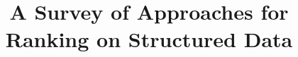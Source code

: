 %
%
%
%
%
%
\documentclass[twocolumn]{svjour3}          %
%
\smartqed  %
%
%
%
%
%

\usepackage{graphicx,amssymb,subfig}
\usepackage{times}
\usepackage{helvet}
\usepackage{courier}
\usepackage{url}
\usepackage{latexsym}
\usepackage{verbatim}
\usepackage{xspace}
\usepackage{algorithm}
\usepackage{float}
\usepackage{multirow} 
\usepackage{bigstrut}
\usepackage{amstext} %
\usepackage{indentfirst} %


\newcommand{\dtr}[1]{(\textbf{Thanh: #1})}




\title{A Survey of Approaches for Ranking on Structured Data%
}

